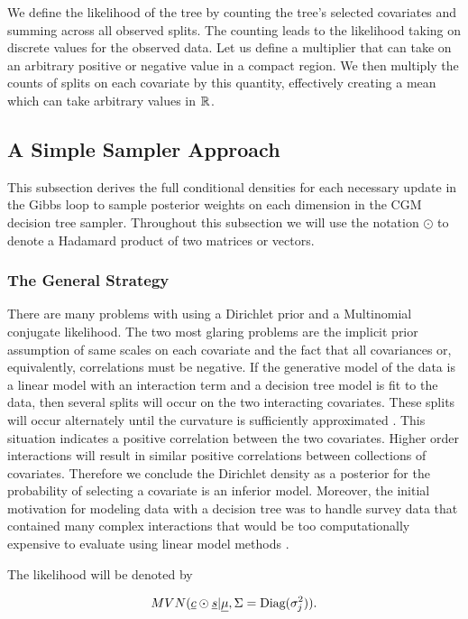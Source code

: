 We define the likelihood of the tree by counting the tree's selected covariates and summing across all observed splits. The counting leads to the likelihood taking on discrete values for the observed data. Let us define a multiplier that can take on an arbitrary positive or negative value in a compact region. We then multiply the counts of splits on each covariate by this quantity, effectively creating a mean which can take arbitrary values in $\mathbb{R}^{}$. 

\subsection{A Simple Sampler Approach}

This subsection derives the full conditional densities for each necessary update in the Gibbs loop to sample posterior weights on each dimension in the CGM decision tree sampler. 
 Throughout this subsection we will use the notation $\odot$ to denote a Hadamard product of two matrices or vectors. 
 
 \subsubsection{The General Strategy}
 There are many problems with using a Dirichlet prior and a Multinomial conjugate likelihood. The two most glaring problems are the implicit prior assumption of same scales on each covariate and the fact that all covariances or, equivalently, correlations must be negative. If the generative model of the data is a linear model with an interaction term and a decision tree model is fit to the data, then several splits will occur on the two interacting covariates. These splits will occur alternately until the curvature is sufficiently approximated \cite{ishwaran2010high}. This situation indicates a positive correlation between the two covariates. Higher order interactions will result in similar positive correlations between collections of covariates. Therefore we conclude the Dirichlet density as a posterior for the probability of selecting a covariate is an inferior model. Moreover, the initial motivation for modeling data with a decision tree was to handle survey data that contained many complex interactions that would be too computationally expensive to evaluate using linear model methods \cite{morgan1963problems}. 
 
 The likelihood will be denoted by
 
 \begin{equation}\newnot{symbol:mvn}
 MVN(\vec{c}\odot\vec{s}\vert \vec{\mu}, \Sigma=\text{Diag}(\sigma^2_j)).
 \end{equation}
 
